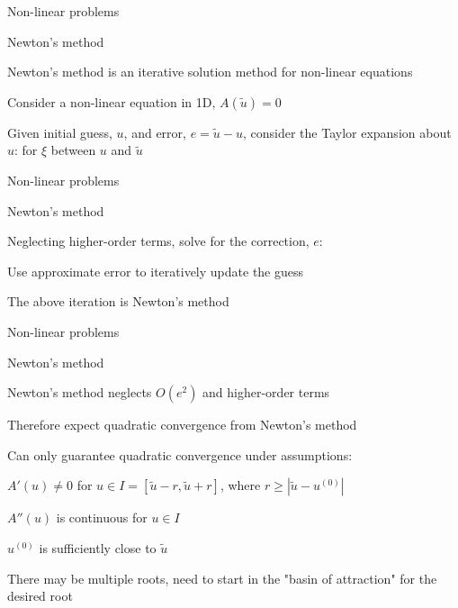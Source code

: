 \documentclass[18pt,xcolor=table]{beamer}
\begin{document}
\begin{frame}{Non-linear problems}
\begin{block}{Newton's method}
\bit
\item Newton's method is an iterative solution method for non-linear equations
\item Consider a non-linear equation in 1D, $A(\tilde{u}) = 0$
\item Given initial guess, $u$, and error, $e = \tilde{u} - u$, consider the Taylor expansion about $u$:
for $\xi$ between $u$ and $\tilde{u}$
\eit
\end{block}
\end{frame}

\begin{frame}{Non-linear problems}
\begin{block}{Newton's method}
\bit
\item Neglecting higher-order terms, solve for the correction, $e$:
\item Use approximate error to iteratively update the guess
\item The above iteration is Newton's method
\eit
\end{block}
\end{frame}

\begin{frame}{Non-linear problems}
\begin{block}{Newton's method}
\bit
\item Newton's method neglects $O(e^2)$ and higher-order terms
\item Therefore expect quadratic convergence from Newton's method
\item Can only guarantee quadratic convergence under assumptions:
\bit
\item $A'(u) \neq 0$ for $u\in I = [\tilde{u} - r, \tilde{u} + r]$, where $r\geq|\tilde{u} - u^{(0)}|$
\item $A''(u)$ is continuous for $u\in I$
\item $u^{(0)}$ is sufficiently close to $\tilde{u}$
\eit
\item There may be multiple roots, need to start in the "basin of attraction" for the desired root
\eit
\end{block}
\end{frame}
\end{document}
